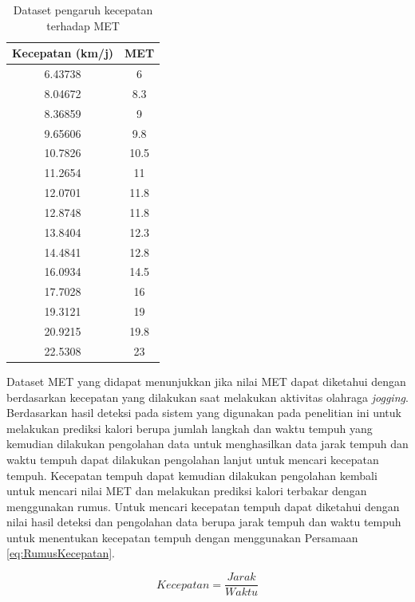 \begin{longtable}{|c|c|}
  \caption{Dataset pengaruh kecepatan terhadap MET}
  \label{tb:DatasetMET}                                   \\
  \hline
  \rowcolor[HTML]{C0C0C0}
  \textbf{Kecepatan (km/j)} & \textbf{MET}  \\
  \hline
  6.43738  & 6    \\
  \hline
  8.04672   & 8.3    \\
  \hline
  8.36859   & 9    \\
  \hline
  9.65606   & 9.8    \\
  \hline
  10.7826   & 10.5    \\
  \hline
  11.2654   & 11    \\
  \hline
  12.0701   & 11.8    \\
  \hline
  12.8748   & 11.8    \\
  \hline
  13.8404   & 12.3    \\
  \hline
  14.4841   & 12.8    \\
  \hline
  16.0934   & 14.5    \\
  \hline
  17.7028   & 16    \\
  \hline
  19.3121   & 19    \\
  \hline
  20.9215   & 19.8    \\
  \hline
  22.5308   & 23    \\
  \hline
\end{longtable}

Dataset MET yang didapat menunjukkan jika nilai MET dapat diketahui dengan berdasarkan kecepatan yang dilakukan saat melakukan aktivitas olahraga \emph{jogging}. Berdasarkan hasil deteksi pada sistem yang digunakan pada penelitian ini untuk melakukan prediksi kalori berupa jumlah langkah dan waktu tempuh yang kemudian dilakukan pengolahan data untuk menghasilkan data jarak tempuh dan waktu tempuh dapat dilakukan pengolahan lanjut untuk mencari kecepatan tempuh. Kecepatan tempuh dapat kemudian dilakukan pengolahan kembali untuk mencari nilai MET dan melakukan prediksi kalori terbakar dengan menggunakan rumus. Untuk mencari kecepatan tempuh dapat diketahui dengan nilai hasil deteksi dan pengolahan data berupa jarak tempuh dan waktu tempuh untuk menentukan kecepatan tempuh dengan menggunakan Persamaan \ref{eq:RumusKecepatan}.

\begin{equation}
  \label{eq:RumusKecepatan}
  Kecepatan = \frac{Jarak}{Waktu}
\end{equation}

